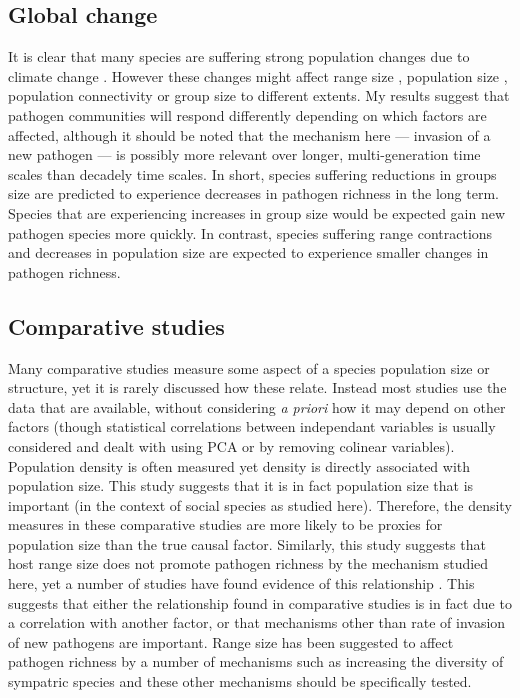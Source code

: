 \subsection{Global change}

It is clear that many species are suffering strong population changes due to climate change \cite{thomas2004extinction}.
However these changes might affect range size \cite{thomas2004extinction}, population size \cite{craigie2010large}, population connectivity \cite{wasserman2013population, rivera2015habitat, fonturbel2014forest} or group size \cite{lehmann2010apes, zunino2007habitat, manor2003impact, atwood2006influence} to different extents.
My results suggest that pathogen communities will respond differently depending on which factors are affected, although it should be noted that the mechanism here --- invasion of a new pathogen --- is possibly more relevant over longer, multi-generation time scales than decadely time scales.
In short, species suffering reductions in groups size \cite{lehmann2010apes, zunino2007habitat, manor2003impact, atwood2006influence} are predicted to experience decreases in pathogen richness in the long term.
Species that are experiencing increases in group size \cite{lehmann2010apes} would be expected gain new pathogen species more quickly.
In contrast, species suffering range contractions \cite{thomas2004extinction} and decreases in population size \cite{craigie2010large} are expected to experience smaller changes in pathogen richness.


\subsection{Comparative studies}

Many comparative studies measure some aspect of a species population size or structure, yet it is rarely discussed how these relate.
Instead most studies use the data that are available, without considering \emph{a priori} how it may depend on other factors (though statistical correlations between independant variables is usually considered and dealt with using PCA or by removing colinear variables).
Population density is often measured \cite{morand1998density, lindenfors2007parasite, nunn2003comparative, arneberg2002host} yet density is directly associated with population size.
This study suggests that it is in fact population size that is important (in the context of social species as studied here).
Therefore, the density measures in these comparative studies are more likely to be proxies for population size than the true causal factor.
Similarly, this study suggests that host range size does not promote pathogen richness by the mechanism studied here, yet a number of studies have found evidence of this relationship \cite{kamiya2014determines, nunn2003comparative}.
This suggests that either the relationship found in comparative studies is in fact due to a correlation with another factor, or that mechanisms other than rate of invasion of new pathogens are important.
Range size has been suggested to affect pathogen richness by a number of mechanisms such as increasing the diversity of sympatric species and these other mechanisms should be specifically tested.

